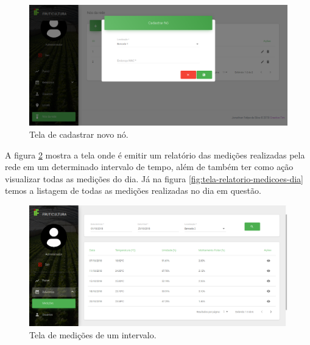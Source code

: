 \begin{figure}[H]
    \centering
    \includegraphics[scale=0.3]{04-figuras/tela_cadastra_no.png}
    \caption{Tela de cadastrar novo nó.}
    \vspace{-\baselineskip}
    \label{fig:tela-cadastrar-no}
\end{figure}


A figura \ref{fig:tela-relatorio-medicoes} mostra a tela onde é emitir um relatório das medições realizadas pela rede em um determinado intervalo de tempo, além de também ter como ação visualizar todas as medições do dia. Já na figura \ref{fig:tela-relatorio-medicoes-dia} temos a listagem de todas as medições realizadas no dia em questão.

\begin{figure}[H]
    \centering
    \includegraphics[scale=0.3]{04-figuras/tela_relatorio_medicoes.png}
    \caption{Tela de medições de um intervalo.}
    \vspace{-\baselineskip}
    \label{fig:tela-relatorio-medicoes}
\end{figure}

